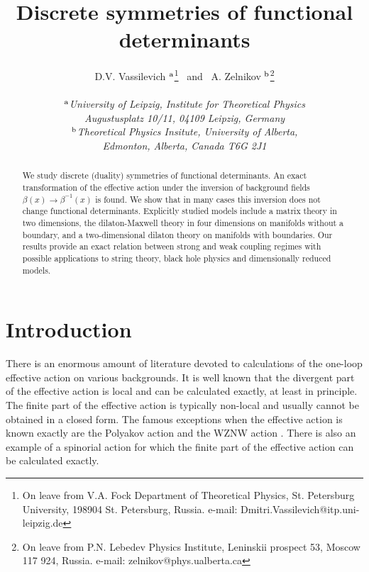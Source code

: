 \documentclass[a4paper,12pt]{article}
\begin{document}
\title{\bf Discrete symmetries of functional determinants}

\author{	  D.V. Vassilevich $^{\rm a}$\thanks{On leave from V.A. Fock
		Department of Theoretical Physics,
     		St. Petersburg University,
     		198904 St. Petersburg, Russia.
     		e-mail: Dmitri.Vassilevich@itp.uni-leipzig.de} 
     ~and~ 
     		A. Zelnikov $^{\rm b}$\thanks{On leave from 
		P.N. Lebedev Physics Institute,
		Leninskii prospect 53, Moscow 117 924, Russia. e-mail:
		zelnikov@phys.ualberta.ca}  \\ {}\\
     {$^{\rm a}$\small\it University of Leipzig, Institute 
     for Theoretical Physics}\\
{\small \it  Augustusplatz 10/11, 04109 Leipzig, Germany}\\ 
{$^{\rm b}$\small\it Theoretical 
Physics Insitute, University of Alberta,}\\
{\small \it Edmonton, Alberta, Canada T6G 2J1}}
\maketitle

\begin{abstract}
We study discrete (duality) symmetries of functional determinants.
An exact transformation of the effective action under the inversion 
of background fields $\beta (x) \to \beta^{-1}(x)$ is found. We show 
that in many cases this inversion does not change functional 
determinants. Explicitly studied models include a matrix theory in 
two dimensions, the dilaton-Maxwell theory in four dimensions on 
manifolds without a boundary, and a two-dimensional dilaton theory 
on manifolds with boundaries. Our results provide an exact relation 
between strong and weak coupling regimes with possible applications 
to string theory, black hole physics and dimensionally reduced models.
\end{abstract}
\section{Introduction}
There is an enormous amount of literature devoted to
calculations of the one-loop effective action on various
backgrounds. It is well known that the divergent part of the
effective action is local and can be calculated exactly, at
least in principle. The finite part of the effective action
is typically non-local and usually cannot be obtained in
a closed form. The famous exceptions when the effective
action is known exactly are the Polyakov action \cite{Polyakov}
and the WZNW action \cite{Witten84,Novikov82}. There is also an example
of a spinorial action \cite{Kummer:1999dc} for which 
the finite part of the effective action can be 
calculated exactly. 
\end{document}
